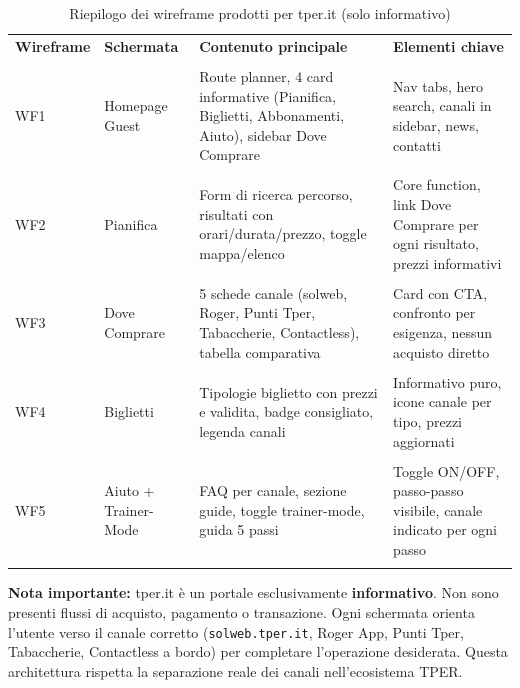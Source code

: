 \documentclass[11pt,a4paper]{article}
\begin{document}
\begin{table}[H]
\centering
\small
\renewcommand{\arraystretch}{1.3}
\begin{tabular}{|p{2cm}|p{3cm}|p{4cm}|p{4.5cm}|}
\hline
\textbf{Wireframe} & \textbf{Schermata} & \textbf{Contenuto principale} & \textbf{Elementi chiave} \\\\[0.1cm]
\hline
WF1 & Homepage Guest & Route planner, 4 card informative (Pianifica, Biglietti, Abbonamenti, Aiuto), sidebar Dove Comprare & Nav tabs, hero search, canali in sidebar, news, contatti \\\\[0.1cm]
\hline
WF2 & Pianifica & Form di ricerca percorso, risultati con orari/durata/prezzo, toggle mappa/elenco & Core function, link Dove Comprare per ogni risultato, prezzi informativi \\\\[0.1cm]
\hline
WF3 & Dove Comprare & 5 schede canale (solweb, Roger, Punti Tper, Tabaccherie, Contactless), tabella comparativa & Card con CTA, confronto per esigenza, nessun acquisto diretto \\\\[0.1cm]
\hline
WF4 & Biglietti & Tipologie biglietto con prezzi e validita, badge consigliato, legenda canali & Informativo puro, icone canale per tipo, prezzi aggiornati \\\\[0.1cm]
\hline
WF5 & Aiuto + Trainer-Mode & FAQ per canale, sezione guide, toggle trainer-mode, guida 5 passi & Toggle ON/OFF, passo-passo visibile, canale indicato per ogni passo \\\\[0.1cm]
\hline
\end{tabular}
\caption{Riepilogo dei wireframe prodotti per tper.it (solo informativo)}
\label{tab:wfsum}
\end{table}

\vspace{0.3cm}

\begin{tcolorbox}[colback=primaryColor!5,colframe=primaryColor,arc=2mm]
\small
\textbf{Nota importante:} tper.it \`e un portale esclusivamente \textbf{informativo}. Non sono presenti flussi di acquisto, pagamento o transazione. Ogni schermata orienta l'utente verso il canale corretto (\texttt{solweb.tper.it}, Roger App, Punti Tper, Tabaccherie, Contactless a bordo) per completare l'operazione desiderata. Questa architettura rispetta la separazione reale dei canali nell'ecosistema TPER.
\end{tcolorbox}
\end{document}
